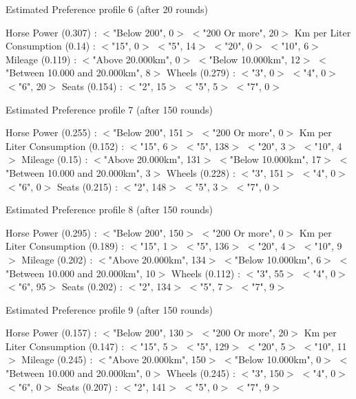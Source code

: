 \begin{table}[H]
\centering
\caption{Estimated Preference profile 6 (after 20 rounds)}
\label{tab:estprefprof6}
Horse Power (0.307) : $<$"Below 200", 0$>$ $<$"200 Or more", 20$>$ 
Km per Liter Consumption (0.14) : $<$"15", 0$>$ $<$"5", 14$>$ $<$"20", 0$>$ $<$"10", 6$>$ 
Mileage (0.119) : $<$"Above 20.000km", 0$>$ $<$"Below 10.000km", 12$>$ $<$"Between 10.000 and 20.000km", 8$>$ 
Wheels (0.279) : $<$"3", 0$>$ $<$"4", 0$>$ $<$"6", 20$>$ 
Seats (0.154) : $<$"2", 15$>$ $<$"5", 5$>$ $<$"7", 0$>$ 
\end{table}

\begin{table}[H]
\centering
\caption{Estimated Preference profile 7 (after 150 rounds)}
\label{tab:estprefprof7}
Horse Power (0.255) : $<$"Below 200", 151$>$ $<$"200 Or more", 0$>$ 
Km per Liter Consumption (0.152) : $<$"15", 6$>$ $<$"5", 138$>$ $<$"20", 3$>$ $<$"10", 4$>$ 
Mileage (0.15) : $<$"Above 20.000km", 131$>$ $<$"Below 10.000km", 17$>$ $<$"Between 10.000 and 20.000km", 3$>$ 
Wheels (0.228) : $<$"3", 151$>$ $<$"4", 0$>$ $<$"6", 0$>$ 
Seats (0.215) : $<$"2", 148$>$ $<$"5", 3$>$ $<$"7", 0$>$ 
\end{table}

\begin{table}[H]
\centering
\caption{Estimated Preference profile 8 (after 150 rounds)}
\label{tab:estprefprof8}
Horse Power (0.295) : $<$"Below 200", 150$>$ $<$"200 Or more", 0$>$ 
Km per Liter Consumption (0.189) : $<$"15", 1$>$ $<$"5", 136$>$ $<$"20", 4$>$ $<$"10", 9$>$ 
Mileage (0.202) : $<$"Above 20.000km", 134$>$ $<$"Below 10.000km", 6$>$ $<$"Between 10.000 and 20.000km", 10$>$ 
Wheels (0.112) : $<$"3", 55$>$ $<$"4", 0$>$ $<$"6", 95$>$ 
Seats (0.202) : $<$"2", 134$>$ $<$"5", 7$>$ $<$"7", 9$>$ 
\end{table}

\begin{table}[H]
\centering
\caption{Estimated Preference profile 9 (after 150 rounds)}
\label{tab:estprefprof9}
Horse Power (0.157) : $<$"Below 200", 130$>$ $<$"200 Or more", 20$>$ 
Km per Liter Consumption (0.147) : $<$"15", 5$>$ $<$"5", 129$>$ $<$"20", 5$>$ $<$"10", 11$>$ 
Mileage (0.245) : $<$"Above 20.000km", 150$>$ $<$"Below 10.000km", 0$>$ $<$"Between 10.000 and 20.000km", 0$>$ 
Wheels (0.245) : $<$"3", 150$>$ $<$"4", 0$>$ $<$"6", 0$>$ 
Seats (0.207) : $<$"2", 141$>$ $<$"5", 0$>$ $<$"7", 9$>$ 
\end{table}